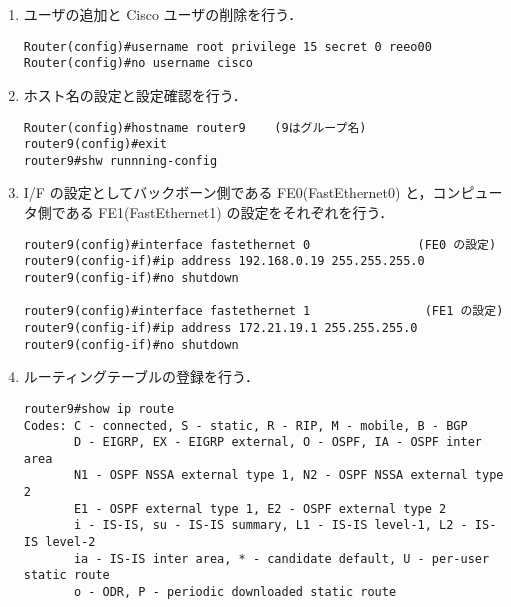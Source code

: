 \documentclass[a4j,titlepage]{jarticle}
\begin{document}
\begin{enumerate}
\item ユーザの追加と Cisco ユーザの削除を行う．

\begin{center}
\begin{screen}
\begin{verbatim}
Router(config)#username root privilege 15 secret 0 reeo00
Router(config)#no username cisco
\end{verbatim}
\end{screen}
\end{center}

\item ホスト名の設定と設定確認を行う．
\begin{center}
\begin{screen}
\begin{verbatim}
Router(config)#hostname router9    (9はグループ名)
router9(config)#exit
router9#shw runnning-config
\end{verbatim}
\end{screen}
\end{center}

\item I/F の設定としてバックボーン側である FE0(FastEthernet0) と，コンピュータ側である FE1(FastEthernet1) の設定をそれぞれを行う．

\begin{center}
\begin{screen}
\begin{verbatim}
router9(config)#interface fastethernet 0               (FE0 の設定)
router9(config-if)#ip address 192.168.0.19 255.255.255.0
router9(config-if)#no shutdown

router9(config)#interface fastethernet 1                (FE1 の設定)
router9(config-if)#ip address 172.21.19.1 255.255.255.0
router9(config-if)#no shutdown
\end{verbatim}
\end{screen}
\end{center}

\item ルーティングテーブルの登録を行う．

  \begin{center}
    \begin{screen}
      \begin{verbatim}
router9#show ip route
Codes: C - connected, S - static, R - RIP, M - mobile, B - BGP
       D - EIGRP, EX - EIGRP external, O - OSPF, IA - OSPF inter area 
       N1 - OSPF NSSA external type 1, N2 - OSPF NSSA external type 2
       E1 - OSPF external type 1, E2 - OSPF external type 2
       i - IS-IS, su - IS-IS summary, L1 - IS-IS level-1, L2 - IS-IS level-2
       ia - IS-IS inter area, * - candidate default, U - per-user static route
       o - ODR, P - periodic downloaded static route


\end{verbatim}
\end{screen}
\end{center}
\end{enumerate}
\end{document}
